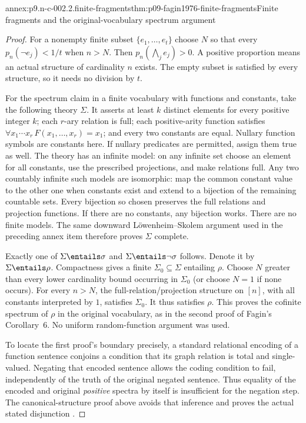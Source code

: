 \begin{annexitem}{annex:p9.n-c-002.2.finite-fragments}{thm:p09-fagin1976-finite-fragments}{Finite fragments and the original-vocabulary spectrum argument}
\begin{proof}
For a nonempty finite subset \(\{e_1,\ldots,e_t\}\) choose \(N\)
so that every \(p_n(\neg e_j)<1/t\) when \(n>N\).
Then \(p_n(\bigwedge_j e_j)>0\).  A positive proportion means an
actual structure of cardinality \(n\) exists.  The empty subset is
satisfied by every structure, so it needs no division by \(t\).

For the spectrum claim in a finite vocabulary with functions and
constants, take the following theory \(\Sigma\).  It asserts at
least \(k\) distinct elements for every positive integer \(k\);
each \(r\)-ary relation is full; each positive-arity function satisfies
\(\forall x_1\cdots x_r\,F(x_1,\ldots,x_r)=x_1\); and every
two constants are equal.  Nullary function symbols are constants here.
If nullary predicates are permitted, assign them true as well.
The theory has an infinite model: on any infinite set choose an element
for all constants, use the prescribed projections, and make relations
full.  Any two countably infinite such models are isomorphic: map the
common constant value to the other one when constants exist and extend
to a bijection of the remaining countable sets.  Every bijection so
chosen preserves the full relations and projection functions.  If there
are no constants, any bijection works.  There are no finite models.
The same downward L\"owenheim--Skolem argument used in the preceding
annex item therefore proves \(\Sigma\) complete.

Exactly one of \(\Sigma\entails\sigma\) and
\(\Sigma\entails\neg\sigma\) follows.  Denote it by
\(\Sigma\entails\rho\).  Compactness gives a finite
\(\Sigma_0\subseteq\Sigma\) entailing \(\rho\).
Choose \(N\) greater than every lower cardinality bound occurring in
\(\Sigma_0\) (or choose \(N=1\) if none occurs).  For every
\(n>N\), the full-relation/projection structure on \([n]\), with
all constants interpreted by \(1\), satisfies \(\Sigma_0\).
It thus satisfies \(\rho\).  This proves the cofinite spectrum of
\(\rho\) in the original vocabulary, as in the second proof of
Fagin's Corollary~6.  No uniform random-function argument was used.

To locate the first proof's boundary precisely, a standard relational
encoding of a function sentence conjoins a condition that its graph
relation is total and single-valued.  Negating that encoded sentence
allows the coding condition to fail, independently of the truth of the
original negated sentence.  Thus equality of the encoded and original
\emph{positive} spectra by itself is insufficient for the negation
step.  The canonical-structure proof above avoids that inference and
proves the actual stated disjunction \cite[pp.~53--54]{Fagin1976}.
\end{proof}
\end{annexitem}

